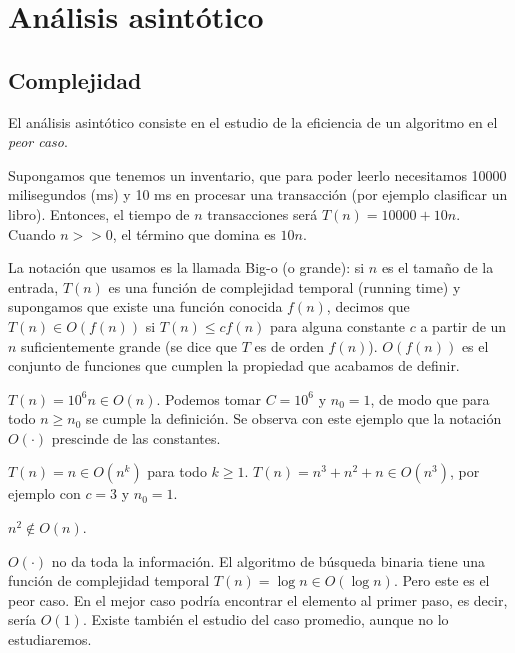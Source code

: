 \documentclass[AL.tex]{subfiles}
\begin{document}

\chapter{Análisis asintótico}

\section{Complejidad}

El análisis asintótico consiste en el estudio de la eficiencia de un algoritmo en el \emph{peor caso}. 

\begin{ej}
Supongamos que tenemos un inventario, que para poder leerlo necesitamos 10000 milisegundos (ms) y 10 ms en procesar una transacción (por ejemplo clasificar un libro). Entonces, el tiempo de $n$ transacciones será $T(n)=10000+10n$. Cuando $n>>0$, el término que domina es $10n$. 
\end{ej}

La notación que usamos es la llamada Big-o (o grande): si $n$ es el tamaño de la entrada, $T(n)$ es una función de complejidad temporal (running time) y supongamos que existe una función conocida $f(n)$, decimos que $T(n)\in O(f(n))$ si $T(n)\leq c f(n)$ para alguna constante $c$ a partir de un $n$ suficientemente grande (se dice que $T$ es de orden $f(n)$). $O(f(n))$ es el conjunto de funciones que cumplen la propiedad que acabamos de definir.

\begin{ej}
$T(n)=10^6n\in O(n)$. Podemos tomar $C=10^6$ y $n_0=1$, de modo que para todo $n\geq n_0$ se cumple la definición. Se observa con este ejemplo que la notación $O(\cdot)$ prescinde de las constantes.
\end{ej}
\begin{ej}
$T(n)=n\in O(n^k)$ para todo $k\geq 1$. $T(n)=n^3+n^2+n\in O(n^3)$, por ejemplo con $c=3$ y $n_0=1$.
\end{ej}

\begin{ej}
$n^2\notin O(n)$. 
\end{ej}

\begin{ej}
$O(\cdot)$ no da toda la información. El algoritmo de búsqueda binaria tiene una función de complejidad temporal $T(n)=\log n\in O(\log n)$. Pero este es el peor caso. En el mejor caso podría encontrar el elemento al primer paso, es decir, sería $O(1)$. Existe también el estudio del caso promedio, aunque no lo estudiaremos. 
\end{ej}
\end{document}
